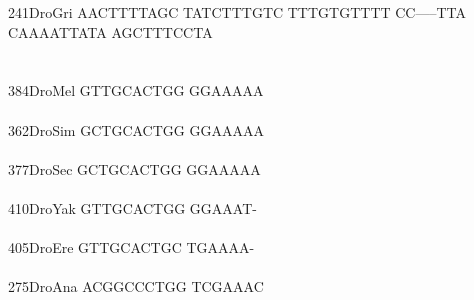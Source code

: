 \documentclass[11pt,twoside,reqno,a4paper]{article}
\begin{document}
{241\hspace*{1\charwidth}DroGri	AACTTTTAGC	TATCTTTGTC	TTTGTGTTTT	CC-----TTA	CAAAATTATA	AGCTTTCCTA	\\
\hspace*{4\charwidth}\hspace*{7\charwidth}\hspace*{1\charwidth}\hspace*{1\charwidth}\hspace*{1\charwidth}\hspace*{1\charwidth}\hspace*{1\charwidth}\hspace*{1\charwidth}\\
\\
384\hspace*{1\charwidth}DroMel	GTTGCACTGG	GGAAAAA\\
\hspace*{4\charwidth}\hspace*{7\charwidth}\hspace*{1\charwidth}\\
362\hspace*{1\charwidth}DroSim	GCTGCACTGG	GGAAAAA\\
\hspace*{4\charwidth}\hspace*{7\charwidth}\hspace*{1\charwidth}\\
377\hspace*{1\charwidth}DroSec	GCTGCACTGG	GGAAAAA\\
\hspace*{4\charwidth}\hspace*{7\charwidth}\hspace*{1\charwidth}\\
410\hspace*{1\charwidth}DroYak	GTTGCACTGG	GGAAAT-\\
\hspace*{4\charwidth}\hspace*{7\charwidth}\hspace*{1\charwidth}\\
405\hspace*{1\charwidth}DroEre	GTTGCACTGC	TGAAAA-\\
\hspace*{4\charwidth}\hspace*{7\charwidth}\hspace*{1\charwidth}\\
275\hspace*{1\charwidth}DroAna	ACGGCCCTGG	TCGAAAC\\
}
\end{document}
